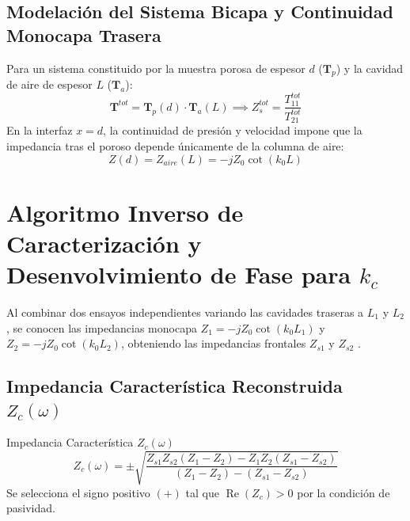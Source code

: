 \documentclass[11pt,a4paper]{article}
\begin{document}
\subsection{Modelación del Sistema Bicapa y Continuidad Monocapa Trasera}
Para un sistema constituido por la muestra porosa de espesor $d$ ($\mathbf{T}_p$) y la cavidad de aire de espesor $L$ ($\mathbf{T}_a$):
\begin{equation}
\mathbf{T}^{tot} = \mathbf{T}_p(d) \cdot \mathbf{T}_a(L) \implies Z_s^{tot} = \frac{T_{11}^{tot}}{T_{21}^{tot}}
\end{equation}
En la interfaz $x = d$, la continuidad de presión y velocidad impone que la impedancia tras el poroso depende únicamente de la columna de aire:
\begin{equation}
Z(d) = Z_{aire}(L) = -j Z_0 \cot(k_0 L)
\end{equation}

\section{\texorpdfstring{Algoritmo Inverso de Caracterización y Desenvolvimiento de Fase para $k_c$}{Algoritmo Inverso y Desenvolvimiento de Fase para k\_c}}
\label{sec:utsuno}

Al combinar dos ensayos independientes variando las cavidades traseras a $L_1$ y $L_2$, se conocen las impedancias monocapa $Z_1 = -j Z_0 \cot(k_0 L_1)$ y $Z_2 = -j Z_0 \cot(k_0 L_2)$, obteniendo las impedancias frontales $Z_{s1}$ y $Z_{s2}$ \citep{utsuno1989}.

\subsection{\texorpdfstring{Impedancia Característica Reconstruida $Z_c(\omega)$}{Impedancia Característica Reconstruida Z\_c(omega)}}
\begin{infobox}{\texorpdfstring{Impedancia Característica $Z_c(\omega)$ \citep{utsuno1989}}{Impedancia Característica Z\_c(omega)}}
\begin{equation}
Z_c(\omega) = \pm \sqrt{\frac{Z_{s1} Z_{s2} (Z_1 - Z_2) - Z_1 Z_2 (Z_{s1} - Z_{s2})}{(Z_1 - Z_2) - (Z_{s1} - Z_{s2})}}
\end{equation}
Se selecciona el signo positivo $(+)$ tal que $\operatorname{Re}(Z_c) > 0$ por la condición de pasividad.
\end{infobox}
\end{document}

